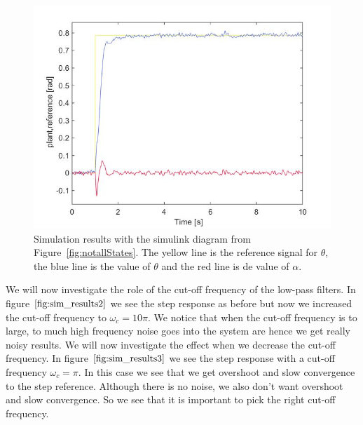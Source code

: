 \documentclass[ twoside,openright,titlepage,numbers=noenddot,headinclude,%
                footinclude=true,cleardoublepage=empty,abstractoff, %
                BCOR=5mm,paper=a4,fontsize=11pt,%
                ngerman,american,%
                ]{scrreprt}
\begin{document}
{{\begin{figure}
\includegraphics[scale=0.5]{images/sim_results1}
\caption{Simulation results with the simulink diagram from Figure~\ref{fig:notallStates}. The yellow line is the reference signal for $\theta$, the blue line is the value of $\theta$ and the red line is de value of $\alpha$. }
\label{fig:sim_results1}
\end{figure}

We will now investigate the role of the cut-off frequency of the low-pass filters. In figure $\eqref{fig:sim_results2}$ we see the step response as before but now we increased the cut-off frequency to $\omega_c = 10 \pi$. We notice that when the cut-off frequency is to large, to much high frequency noise goes into the system are hence we get really noisy results. We will now investigate the effect when we decrease the cut-off frequency. In figure $\eqref{fig:sim_results3}$ we see the step response with a cut-off frequency $\omega_c = \pi$. In this case we see that we get overshoot and slow convergence to the step reference. Although there is no noise, we also don't want overshoot and slow convergence. So we see that it is important to pick the right cut-off frequency.

}}
\end{document}

